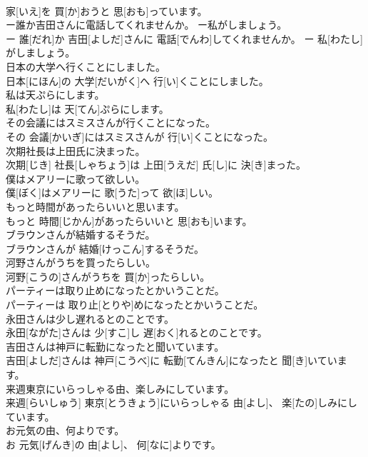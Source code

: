 \documentclass[8pt]{extreport}
\begin{document}
\begin{CJK}{UTF8}{min}
\\	家[いえ]を 買[か]おうと 思[おも]っています。
\\	ー誰か吉田さんに電話してくれませんか。 ー私がしましょう。	
\\	ー 誰[だれ]か 吉田[よしだ]さんに 電話[でんわ]してくれませんか。 ー 私[わたし]がしましょう。
\\	日本の大学へ行くことにしました。	
\\	日本[にほん]の 大学[だいがく]へ 行[い]くことにしました。
\\	私は天ぷらにします。	
\\	私[わたし]は 天[てん]ぷらにします。
\\	その会議にはスミスさんが行くことになった。	
\\	その 会議[かいぎ]にはスミスさんが 行[い]くことになった。
\\	次期社長は上田氏に決まった。	
\\	次期[じき] 社長[しゃちょう]は 上田[うえだ] 氏[し]に 決[き]まった。
\\	僕はメアリーに歌って欲しい。	
\\	僕[ぼく]はメアリーに 歌[うた]って 欲[ほ]しい。
\\	もっと時間があったらいいと思います。	
\\	もっと 時間[じかん]があったらいいと 思[おも]います。
\\	ブラウンさんが結婚するそうだ。	
\\	ブラウンさんが 結婚[けっこん]するそうだ。
\\	河野さんがうちを買ったらしい。	
\\	河野[こうの]さんがうちを 買[か]ったらしい。
\\	パーティーは取り止めになったとかいうことだ。	
\\	パーティーは 取り止[とりや]めになったとかいうことだ。
\\	永田さんは少し遅れるとのことです。	
\\	永田[ながた]さんは 少[すこ]し 遅[おく]れるとのことです。
\\	吉田さんは神戸に転勤になったと聞いています。	
\\	吉田[よしだ]さんは 神戸[こうべ]に 転勤[てんきん]になったと 聞[き]いています。
\\	来週東京にいらっしゃる由、楽しみにしています。	
\\	来週[らいしゅう] 東京[とうきょう]にいらっしゃる 由[よし]、 楽[たの]しみにしています。
\\	お元気の由、何よりです。	
\\	お 元気[げんき]の 由[よし]、 何[なに]よりです。

\end{CJK}
\end{document}
